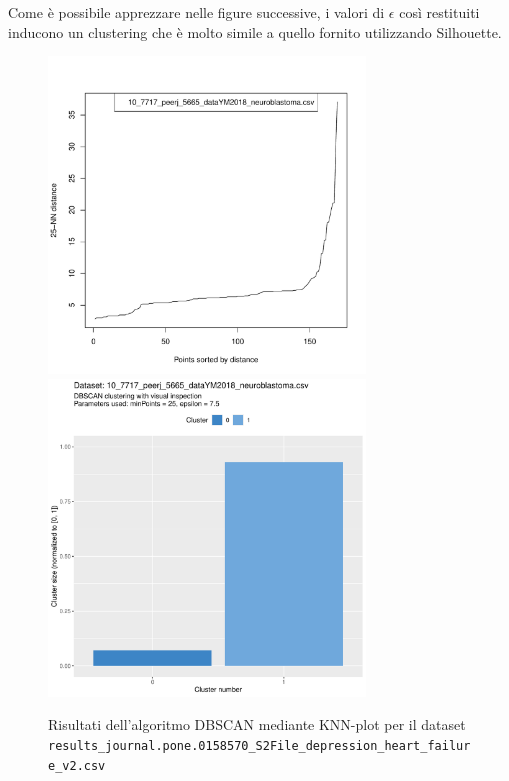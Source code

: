 \documentclass[12pt]{report}
\begin{document}
			Come è possibile apprezzare nelle figure successive, i valori
			di $\epsilon$ così restituiti inducono un clustering che è molto
			simile a quello fornito utilizzando Silhouette.

			\begin{figure}[h]
				\centering
				\includegraphics[width = 0.75\textwidth, height = 0.45\textheight, page = 1]{
					doc/DBSCAN_optimal_MinPts.pdf
				}
				\includegraphics[width = 0.75\textwidth, height = 0.45\textheight, page = 1]{
					results/DBSCAN_visual_comparison.pdf
				}
				\caption{Risultati dell'algoritmo DBSCAN mediante KNN-plot per il dataset
				\texttt{results\_journal.pone.0158570\_S2File\_depression\_heart\_failure\_v2.csv}}
				\label{fig:dbscan-extra1}
			\end{figure}
\end{document}

